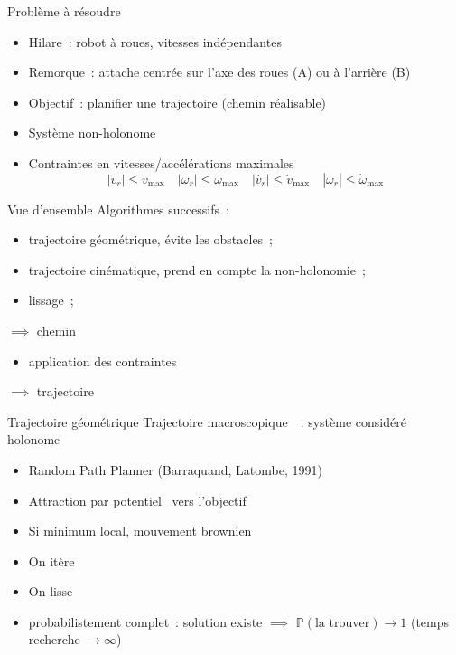 \documentclass[11pt]{beamer}
\newcommand{\abs}[1]{\left\vert{} #1 \right\vert{}}
\begin{document}
\begin{frame}{Problème à résoudre}
	\begin{itemize}
		\item Hilare~: robot à roues, vitesses indépendantes
		\item Remorque~: attache centrée sur l'axe des roues (A) ou à l'arrière
			(B)
		\item Objectif~: planifier une trajectoire (chemin réalisable)
		\item Système non-holonome
		\item Contraintes en vitesses/accélérations maximales
			\[ \abs{v_r} \leq v_{\max} \quad
			\abs{\omega_r} \leq \omega_{\max} \quad
			\abs{\dot{v_r}} \leq \dot{v}_{\max} \quad
			\abs{\dot{\omega_r}} \leq \dot{\omega}_{\max} \]
	\end{itemize}
\end{frame}

\begin{frame}{Vue d'ensemble}
	Algorithmes successifs~:
	\begin{itemize}
		\item trajectoire \alert{géométrique}, évite les obstacles~;
			\pause{}
		\item trajectoire \alert{cinématique}, prend en compte la
			non-holonomie~;
			\pause{}
		\item lissage~;
	\end{itemize}
	\hspace{2cm}\alert{$\implies$ chemin}
			\pause{}
	\begin{itemize}
		\item application des contraintes
	\end{itemize}
	\hspace{2cm}\alert{$\implies$ trajectoire}
\end{frame}

\begin{frame}{Trajectoire géométrique}
	Trajectoire \og{}macroscopique~\fg~: système considéré holonome
	\begin{itemize}
		\item Random Path Planner (Barraquand, Latombe, 1991)
		\item Attraction par \og{}potentiel~\fg{} vers l'objectif
		\item Si minimum local, mouvement brownien
		\item On itère
		\item On lisse
			\vspace{1em}
		\item probabilistement complet~: solution existe $\implies$
			$\mathbb{P}(\text{la trouver}) \rightarrow 1$ (temps recherche
			$\rightarrow \infty$)
	\end{itemize}
\end{frame}
\end{document}
